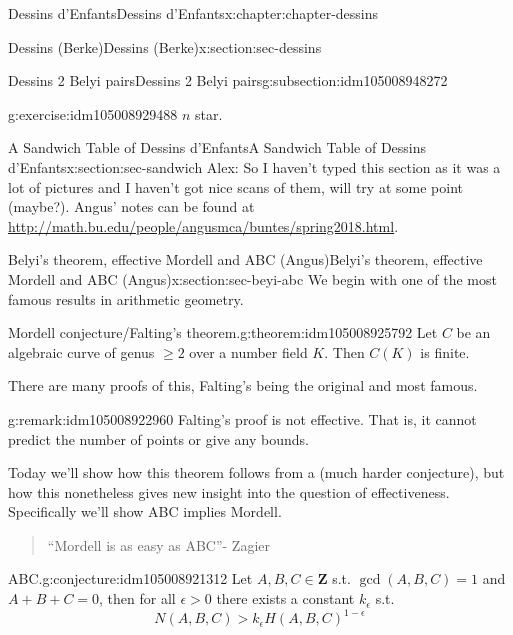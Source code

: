 \documentclass[oneside,10pt,]{book}
\numberwithin{equation}{section}
\newcommand{\ZZ}{\mathbf{Z}}
\newcommand{\gt}{>}
\begin{document}
\begin{chapterptx}{Dessins d'Enfants}{}{Dessins d'Enfants}{}{}{x:chapter:chapter-dessins}
\begin{sectionptx}{Dessins (Berke)}{}{Dessins (Berke)}{}{}{x:section:sec-dessins}
\begin{subsectionptx}{Dessins 2 Belyi pairs}{}{Dessins 2 Belyi pairs}{}{}{g:subsection:idm105008948272}
\begin{inlineexercise}{}{g:exercise:idm105008929488}
\(n\) star.%
\end{inlineexercise}
\end{subsectionptx}
\end{sectionptx}
%
%
\typeout{************************************************}
\typeout{************************************************}
%
\begin{sectionptx}{A Sandwich Table of Dessins d'Enfants}{}{A Sandwich Table of Dessins d'Enfants}{}{}{x:section:sec-sandwich}
Alex: So I haven't typed this section as it was a lot of pictures and I haven't got nice scans of them, will try at some point (maybe?). Angus' notes can be found at \url{http://math.bu.edu/people/angusmca/buntes/spring2018.html}.%
\end{sectionptx}
%
%
\typeout{************************************************}
\typeout{************************************************}
%
\begin{sectionptx}{Belyi's theorem, effective Mordell and ABC (Angus)}{}{Belyi's theorem, effective Mordell and ABC (Angus)}{}{}{x:section:sec-beyi-abc}
We begin with one of the most famous results in arithmetic geometry.%
\begin{theorem}{Mordell conjecture\slash{}Falting's theorem.}{}{g:theorem:idm105008925792}%
Let \(C\) be an algebraic curve of genus \(\ge 2\) over a number field \(K\). Then \(C(K)\) is finite.%
\end{theorem}
There are many proofs of this, Falting's being the original and most famous.%
\begin{remark}{}{g:remark:idm105008922960}%
Falting's proof is not effective. That is, it cannot predict the number of points or give any bounds.%
\end{remark}
Today we'll show how this theorem follows from a (much harder conjecture), but how this nonetheless gives new insight into the question of effectiveness. Specifically we'll show ABC implies Mordell.%
\begin{quote}%
``Mordell is as easy as ABC''- Zagier%
\end{quote}
\begin{conjecture}{ABC.}{}{g:conjecture:idm105008921312}%
Let \(A,B,C\in \ZZ\) s.t. \(\gcd(A,B,C)  =1 \) and \(A+B+C=0\), then for all \(\epsilon \gt 0\) there exists a constant \(k_\epsilon\) s.t.%
\begin{equation*}
N(A,B,C) \gt k_\epsilon H(A,B,C)^{1-\epsilon}
\end{equation*}

\end{conjecture}
\end{sectionptx}
\end{chapterptx}
\end{document}
